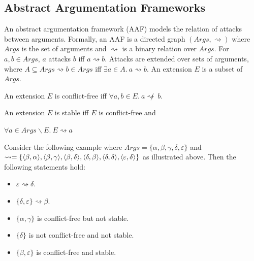 \subsection{Abstract Argumentation Frameworks}

An abstract argumentation framework (AAF) models the relation of attacks between arguments.\cite{aa} Formally, an AAF is a directed graph $(Args,\rightsquigarrow)$ where $Args$ is the set of arguments and $\rightsquigarrow$ is a binary relation over $Args$. For $a,b\in Args$, $a$ attacks $b$ iff $a\rightsquigarrow b$. Attacks are extended over sets of arguments, where $A\subseteq Args\rightsquigarrow b\in Args$ iff $\exists a\in A.\ a\rightsquigarrow b$. An extension $E$ is a subset of $Args$.

\begin{definition}
	An extension $E$ is conflict-free iff $\forall a,b\in E.\ a\not\rightsquigarrow\ b$.
\end{definition}

\begin{definition}
	An extension $E$ is stable iff $E$ is conflict-free and
	
	$\forall a\in Args\backslash E.\ E\rightsquigarrow a$
\end{definition}

\begin{center}
\end{center}

Consider the following example where $Args=\{\alpha,\beta,\gamma,\delta,\varepsilon\}$ and $	\rightsquigarrow=\{
\langle{\beta},{\alpha}\rangle,\\
\langle{\beta},{\gamma}\rangle,
\langle{\beta},{\delta}\rangle,
\langle{\delta},{\beta}\rangle,
\langle{\delta},{\delta}\rangle,
\langle{\varepsilon},{\delta}\rangle
\}$ as illustrated above. Then the following statements hold:
\begin{itemize}
	\item $\varepsilon\rightsquigarrow\delta$.
	\item $\{\delta,\varepsilon\}\rightsquigarrow\beta$.
	\item $\{\alpha,\gamma\}$ is conflict-free but not stable.
	\item $\{\delta\}$ is not conflict-free and not stable.
	\item $\{\beta,\varepsilon\}$ is conflict-free and stable.
\end{itemize}
